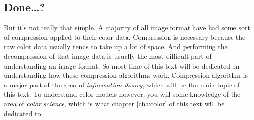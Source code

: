 \subsection{Done\dots?}

But it's not really that simple. A majority of all image format have
had some sort of compression applied to their color data. Compression
is necessary because the raw color data usually tends to take up a lot
of space. And performing the decompression of that image data is
usually the most difficult part of understanding an image format. So
most time of this text will be dedicated on understanding how these
compression algorithms work. Compression algorithm is a major part of
the area of \textit{information theory}, which will be the main topic
of this text. To understand color models however, you will some
knowledge of the area of \textit{color science}, which is what chapter
\ref{cha:color} of this text will be dedicated to.
